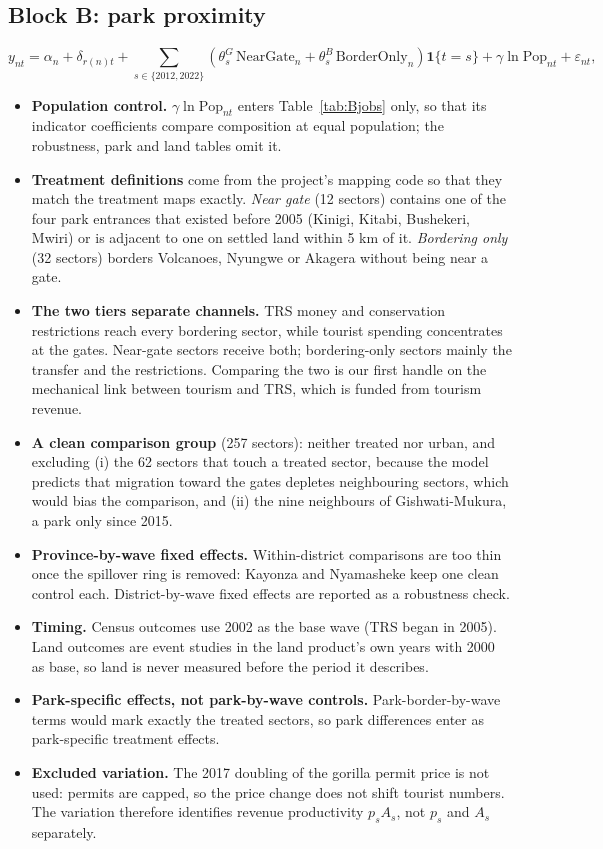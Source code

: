 \documentclass[11pt]{article}
\begin{document}
\subsection{Block B: park proximity}
\begin{equation*}
y_{nt}=\alpha_n+\delta_{r(n)t}+\textstyle\sum_{s\in\{2012,2022\}}\left(\theta^{G}_s\,\text{NearGate}_n+\theta^{B}_s\,\text{BorderOnly}_n\right)\mathbf{1}\{t=s\}+\gamma\ln\text{Pop}_{nt}+\varepsilon_{nt},
\end{equation*}
\begin{itemize}
\item \textbf{Population control.} $\gamma\ln\text{Pop}_{nt}$ enters Table~\ref{tab:Bjobs} only, so that its indicator coefficients compare composition at equal population; the robustness, park and land tables omit it.
\item \textbf{Treatment definitions} come from the project's mapping code so that they match the treatment maps exactly. \emph{Near gate} (12 sectors) contains one of the four park entrances that existed before 2005 (Kinigi, Kitabi, Bushekeri, Mwiri) or is adjacent to one on settled land within 5 km of it. \emph{Bordering only} (32 sectors) borders Volcanoes, Nyungwe or Akagera without being near a gate.
\item \textbf{The two tiers separate channels.} TRS money and conservation restrictions reach every bordering sector, while tourist spending concentrates at the gates. Near-gate sectors receive both; bordering-only sectors mainly the transfer and the restrictions. Comparing the two is our first handle on the mechanical link between tourism and TRS, which is funded from tourism revenue.
\item \textbf{A clean comparison group} (257 sectors): neither treated nor urban, and excluding (i) the 62 sectors that touch a treated sector, because the model predicts that migration toward the gates depletes neighbouring sectors, which would bias the comparison, and (ii) the nine neighbours of Gishwati-Mukura, a park only since 2015.
\item \textbf{Province-by-wave fixed effects.} Within-district comparisons are too thin once the spillover ring is removed: Kayonza and Nyamasheke keep one clean control each. District-by-wave fixed effects are reported as a robustness check.
\item \textbf{Timing.} Census outcomes use 2002 as the base wave (TRS began in 2005). Land outcomes are event studies in the land product's own years with 2000 as base, so land is never measured before the period it describes.
\item \textbf{Park-specific effects, not park-by-wave controls.} Park-border-by-wave terms would mark exactly the treated sectors, so park differences enter as park-specific treatment effects.
\item \textbf{Excluded variation.} The 2017 doubling of the gorilla permit price is not used: permits are capped, so the price change does not shift tourist numbers. The variation therefore identifies revenue productivity $p_sA_s$, not $p_s$ and $A_s$ separately.
\end{itemize}
\end{document}
